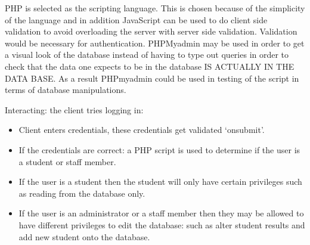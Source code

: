 \documentclass[10pt,onecolumn]{RequimentsGathering}
\begin{document}
PHP is  selected as the scripting language. This is chosen because of the simplicity of the language and in addition JavaScript can be used to do client side validation to avoid overloading the server with server side validation. Validation would be necessary for authentication. 
PHPMyadmin may be used in order to get a visual look of the database instead of having to type out queries in order to check that the data one expects to be in the database IS ACTUALLY IN THE DATA BASE. As a result PHPmyadmin could be used in testing of the script in terms of database manipulations.

Interacting: the client tries logging in:

\begin{itemize}
\item Client enters credentials, these credentials get validated ‘onsubmit’.
\item If the credentials are correct: a PHP script is used to determine if the user is a  student or staff member.
\item If the user is a student then the student will only have certain privileges such as reading from the database  only.
\item If the user is an administrator or a staff member then they may be allowed to have different privileges to edit the database: such as alter student results and add new student onto the database.
\end{itemize}

\vfill




\end{document}
